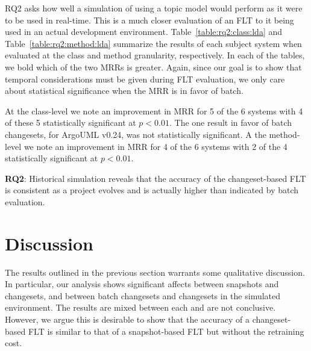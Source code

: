 

RQ2 asks how well a simulation of using a topic model would perform as it were
to be used in real-time.  This is a much closer evaluation of an FLT to it being
used in an actual development environment.  Table~\ref{table:rq2:class:lda} and
Table~\ref{table:rq2:method:lda} summarize the results of each subject system
when evaluated at the class and method granularity, respectively.  In each of
the tables, we bold which of the two MRRs is greater.  Again, since our goal is
to show that temporal considerations must be given during FLT evaluation, we
only care about statistical significance when the MRR is in favor of batch.

At the class-level we note an improvement in MRR for 5 of the 6 systems with 4
of these 5 statistically significant at $p<0.01$.  The one result in favor of
batch changesets, for ArgoUML v0.24, was not statistically significant.  A the
method-level we note an improvement in MRR for 4 of the 6 systems with 2 of the
4 statistically significant at $p<0.01$.

\begin{framed}
    \textbf{RQ2}:
    Historical simulation reveals that the accuracy of the changeset-based FLT
    is consistent as a project evolves and is actually higher than indicated by
    batch evaluation.
\end{framed}



\section{Discussion}

The results outlined in the previous section warrants some qualitative
discussion.  In particular, our analysis shows significant affects between
snapshots and changesets, and between batch changesets and changesets in the
simulated environment.  The results are mixed between each and are not
conclusive.  However, we argue this is desirable to show that the accuracy of a
changeset-based FLT is similar to that of a snapshot-based FLT but without the
retraining cost.

